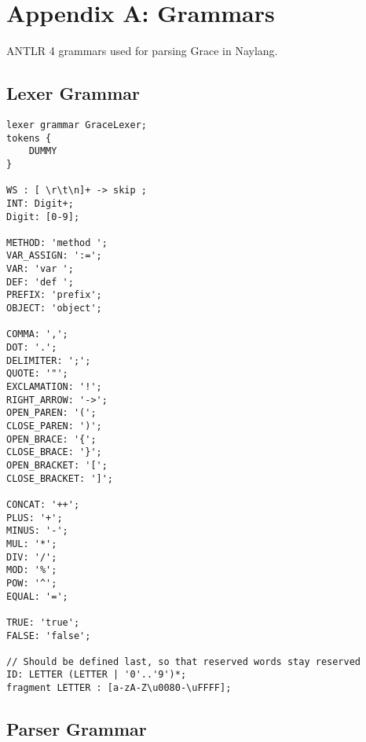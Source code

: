 \chapter{Appendix A: Grammars}\label{appendix-a-grammars}

ANTLR 4 grammars used for parsing Grace in Naylang.

\section{Lexer Grammar}\label{lexer-grammar}

\begin{verbatim}
lexer grammar GraceLexer;
tokens {
    DUMMY
}

WS : [ \r\t\n]+ -> skip ;
INT: Digit+;
Digit: [0-9];

METHOD: 'method ';
VAR_ASSIGN: ':=';
VAR: 'var ';
DEF: 'def ';
PREFIX: 'prefix';
OBJECT: 'object';

COMMA: ',';
DOT: '.';
DELIMITER: ';';
QUOTE: '"';
EXCLAMATION: '!';
RIGHT_ARROW: '->';
OPEN_PAREN: '(';
CLOSE_PAREN: ')';
OPEN_BRACE: '{';
CLOSE_BRACE: '}';
OPEN_BRACKET: '[';
CLOSE_BRACKET: ']';

CONCAT: '++';
PLUS: '+';
MINUS: '-';
MUL: '*';
DIV: '/';
MOD: '%';
POW: '^';
EQUAL: '=';

TRUE: 'true';
FALSE: 'false';

// Should be defined last, so that reserved words stay reserved
ID: LETTER (LETTER | '0'..'9')*;
fragment LETTER : [a-zA-Z\u0080-\uFFFF];
\end{verbatim}

\section{Parser Grammar}\label{parser-grammar}

